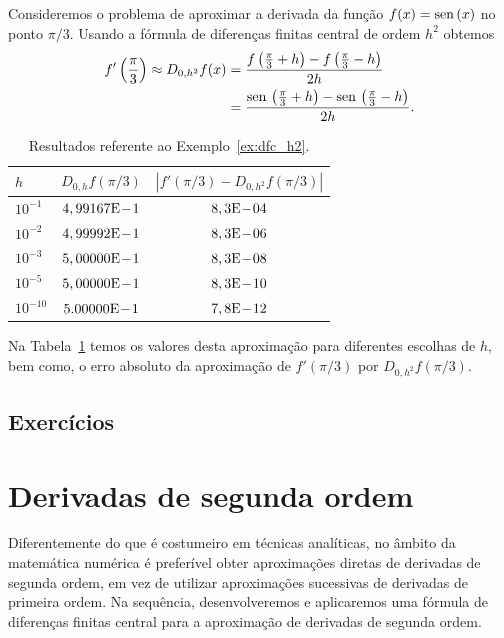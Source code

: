 \begin{ex}\label{ex:dfc_h2}
  Consideremos o problema de aproximar a derivada da função $f(x) = \operatorname{sen}\,(x)$ no ponto $\pi/3$. Usando a fórmula de diferenças finitas central de ordem $h^2$ obtemos
  \begin{align}
    f'\left(\frac{\pi}{3}\right) \approx D_{0,h^2}f(x) &= \frac{f\left(\frac{\pi}{3}+h\right)-f\left(\frac{\pi}{3}-h\right)}{2h}\\
          &= \frac{\operatorname{sen}\,\left(\frac{\pi}{3}+h\right)-\operatorname{sen}\,\left(\frac{\pi}{3}-h\right)}{2h}. 
  \end{align}

\begin{table}[h!]
  \centering
  \caption{Resultados referente ao Exemplo~\ref{ex:dfc_h2}.}
  \begin{tabular}{l|c|c}
    $h$ & $D_{0,h}f(\pi/3)$ & $|f'(\pi/3)-D_{0,h^2}f(\pi/3)|$\\ \hline
    $10^{-1}$ & $4,99167\mathrm{E}\!-\!1$ & $8,3\mathrm{E}\!-\!04$ \\
    $10^{-2}$ & $4,99992\mathrm{E}\!-\!1$ & $8,3\mathrm{E}\!-\!06$ \\
    $10^{-3}$ & $5,00000\mathrm{E}\!-\!1$ & $8,3\mathrm{E}\!-\!08$ \\
    $10^{-5}$ & $5,00000\mathrm{E}\!-\!1$ & $8,3\mathrm{E}\!-\!10$ \\
    $10^{-10}$ & $5.00000\mathrm{E}\!-\!1$ & $7,8\mathrm{E}\!-\!12$ \\\hline
  \end{tabular}
  \label{tab:ex_dfc_h2}
\end{table}

Na Tabela~\ref{tab:ex_dfc_h2} temos os valores desta aproximação para diferentes escolhas de $h$, bem como, o erro absoluto da aproximação de $f'(\pi/3)$ por $D_{0,h^2}f(\pi/3)$.

\end{ex}


\subsection*{Exercícios}

\emconstrucao

\section{Derivadas de segunda ordem}\label{cap_deriv_sec_d2f}

Diferentemente do que é costumeiro em técnicas analíticas, no âmbito da matemática numérica é preferível obter aproximações diretas de derivadas de segunda ordem, em vez de utilizar aproximações sucessivas de derivadas de primeira ordem. Na sequência, desenvolveremos e aplicaremos uma fórmula de diferenças finitas central para a aproximação de derivadas de segunda ordem.

